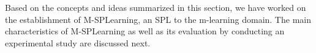 Based on the concepts and ideas summarized in this section, we have worked on the establishment of M-SPLearning, an SPL to the m-learning domain. The main characteristics of M-SPLearning as well as its evaluation by conducting an experimental study are discussed next. 

